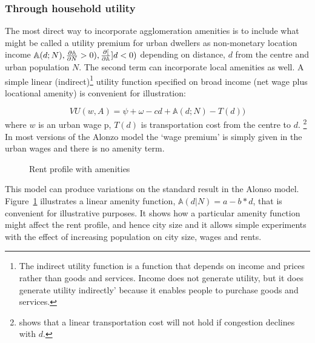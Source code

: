 \subsubsection{Through household utility}
The most direct way to incorporate agglomeration amenities is  to include what might be called a \gls{utility premium} for urban dwellers as non-monetary location income $\mathbb{A}(d; N), \frac{\partial \mathbb{A}}{\partial N}> 0), \frac{\partial [}{\partial \mathbb{A}}]{d}< 0)$ depending on distance, $d$ from the centre and urban population $N$. The second term can incorporate local amenities as well. A simple linear (indirect)\footnote{The indirect utility function is a function that depends on income and prices rather than goods and services.  Income does not generate utility, but it does generate utility indirectly' because it enables people to purchase goods and services.} utility function specified on broad income (net wage plus locational amenity) is convenient for illustration:

\begin{equation}VU(w,A)= \psi+ \omega-cd + \mathbb{A}(d; N) - T(d))
\label{eqn-u}
\end{equation}
where $w$  is an urban wage p, $T(d)$ is transportation cost from the centre to $d$.
\footnote{\cite{anasUrbanSpatialStructure1998} shows that a linear transportation cost will not  hold if congestion declines  with $d$.} 
 In most versions of the Alonzo model the `wage premium' is simply given in the urban wages and there is no amenity term. 


 
\begin{figure}[t!b]
\begin{center}

\end{center}
\caption{Rent profile with amenities}
\label{fig-amenity}
\end{figure}

 This model can produce variations on the standard result in the Alonso model. Figure~\ref{fig-amenity} illustrates a linear amenity function, $\mathbb{A}(d|N)= a-b*d$, that is convenient for illustrative purposes.  It shows how a particular amenity function might affect the rent profile, and hence city size and it allows simple experiments with the effect of increasing population on city size, wages and rents. 

